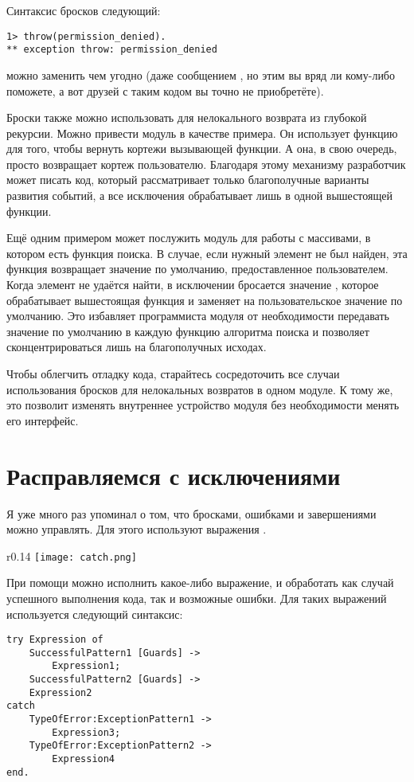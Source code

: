 Синтаксис бросков следующий:
\begin{lstlisting}[style=erlang]
1> throw(permission_denied).
** exception throw: permission_denied
\end{lstlisting}
 можно заменить чем угодно (даже сообщением , но этим вы вряд ли кому-либо поможете, а вот друзей с таким кодом вы точно не приобретёте).

Броски также можно использовать для нелокального возврата из глубокой рекурсии.
Можно привести модуль  в качестве примера.
Он использует функцию  для того, чтобы вернуть кортежи  вызывающей функции.
А она, в свою очередь, просто возвращает кортеж пользователю.
Благодаря этому механизму разработчик может писать код, который рассматривает только благополучные варианты развития событий, а все исключения обрабатывает лишь в одной вышестоящей функции.

Ещё одним примером может послужить модуль для работы с массивами, в котором есть функция поиска.
В случае, если нужный элемент не был найден, эта функция возвращает значение по умолчанию, предоставленное пользователем.
Когда элемент не удаётся найти, в исключении бросается значение , которое обрабатывает вышестоящая функция и заменяет на пользовательское значение по умолчанию.
Это избавляет программиста модуля от необходимости передавать значение по умолчанию в каждую функцию алгоритма поиска и позволяет сконцентрироваться лишь на благополучных исходах.

Чтобы облегчить отладку кода, старайтесь сосредоточить все случаи использования бросков для нелокальных возвратов в одном модуле.
К тому же, это позволит изменять внутреннее устройство модуля без необходимости менять его интерфейс.
\section{Расправляемся с исключениями}
\label{dealing-with-exceptions}
Я уже много раз упоминал о том, что бросками, ошибками и завершениями можно управлять.
Для этого используют выражения .
\begin{wrapfigure}{r}{0.14\linewidth}
    \texttt{[image: catch.png]}
\end{wrapfigure}
При помощи  можно исполнить какое\--либо выражение, и обработать как случай успешного выполнения кода, так и возможные ошибки.
Для таких выражений используется следующий синтаксис:
\begin{lstlisting}[style=erlang]
try Expression of
    SuccessfulPattern1 [Guards] ->
        Expression1;
    SuccessfulPattern2 [Guards] ->
    Expression2
catch
    TypeOfError:ExceptionPattern1 ->
        Expression3;
    TypeOfError:ExceptionPattern2 ->
        Expression4
end.
\end{lstlisting}

